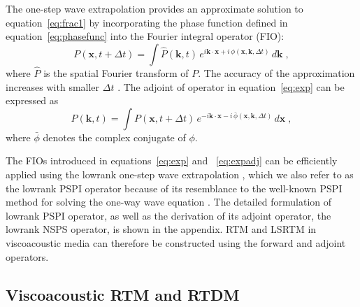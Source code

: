 The one-step wave extrapolation provides an approximate solution to equation~\ref{eq:frac1} by incorporating the phase function defined in equation~\ref{eq:phasefunc} into the Fourier integral operator (FIO):
\begin{equation}
  \label{eq:exp}
  P(\mathbf{x},t+\Delta t) = \int \hat{P}(\mathbf{k},t)\,e^{i\mathbf{k} \cdot \mathbf{x} + i\,\phi(\mathbf{x},\mathbf{k},\Delta t)}\,d\mathbf{k}\;,
\end{equation}
where $\hat{P}$ is the spatial Fourier transform of $P$. The accuracy of the approximation increases with smaller $\Delta t$ \cite[]{lowrank}. The adjoint of operator in equation~\ref{eq:exp} can be expressed as
\begin{equation}
  \label{eq:expadj}
  \hat{P}(\mathbf{k},t) = \int P(\mathbf{x},t+\Delta t)\,e^{-i\mathbf{k} \cdot \mathbf{x} - i\,\bar{\phi}(\mathbf{x},\mathbf{k},\Delta t)}\,d\mathbf{x}\; ,
\end{equation}
where $\bar{\phi}$ denotes the complex conjugate of $\phi$.

The FIOs introduced in equations~\ref{eq:exp} and ~\ref{eq:expadj} can be efficiently applied using the lowrank one-step wave extrapolation \cite{me15a}, which we also refer to as the lowrank PSPI operator because of its resemblance to the well-known PSPI method for solving the one-way wave equation \cite[]{gazdag84,kessinger,margraveandferguson}. The detailed formulation of lowrank PSPI operator, as well as the derivation of its adjoint operator, the lowrank NSPS operator, is shown in the appendix. RTM and LSRTM in viscoacoustic media can therefore be constructed using the forward and adjoint operators. 

\subsection{Viscoacoustic RTM and RTDM}

